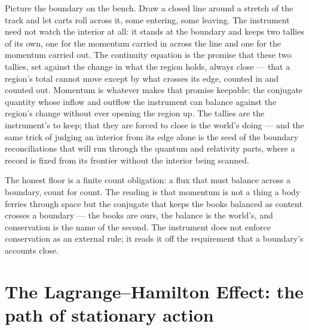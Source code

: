Picture the boundary on the bench. Draw a closed line around a stretch of the track and let carts roll across
it, some entering, some leaving. The instrument need not watch the interior at all: it stands at the boundary
and keeps two tallies of its own, one for the momentum carried in across the line and one for the momentum
carried out. The continuity equation is the promise that these two tallies, set against the change in what the
region holds, always close --- that a region's total cannot move except by what crosses its edge, counted in
and counted out. Momentum is whatever makes that promise keepable: the conjugate quantity whose inflow and
outflow the instrument can balance against the region's change without ever opening the region up. The tallies
are the instrument's to keep; that they are forced to close is the world's doing --- and the same trick of
judging an interior from
its edge alone is the seed of the boundary reconciliations that will run through the quantum and relativity
parts, where a record is fixed from its frontier without the interior being scanned.

The honest floor is a finite count obligation: a flux that must balance across a boundary, count for count.
The reading is that momentum is not a thing a body ferries through space but the conjugate that keeps the
books balanced as content crosses a boundary --- the books are ours, the balance is the world's, and
conservation is the name of the second. The instrument does not enforce conservation as an external rule; it
reads it off the requirement that a boundary's accounts close.

\section{The Lagrange--Hamilton Effect: the path of stationary action}
\label{se:lagrange-hamilton}

